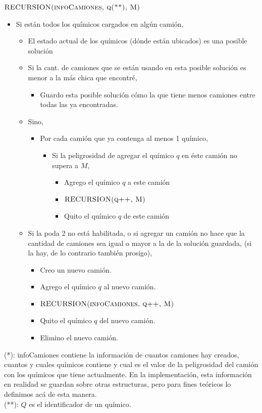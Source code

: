 \noindent
$\textnormal{\scshape RECURSION(infoCamiones, q(**), M)}$
\begin{itemize}
	\item Si est\'an todos los qu\'imicos cargados en alg\'un cami\'on,							
	\begin{itemize}
		\item El estado actual de los qu\'imicos (d\'onde est\'an ubicados) es una posible soluci\'on
		\item Si la cant. de camiones que se est\'an usando en esta posible soluci\'on es menor a la m\'as chica que encontr\'e,
		\begin{itemize}
			\item Guardo esta posible soluci\'on c\'omo la que tiene menos camiones entre todas las ya encontradas.
		\end{itemize}																												
		\item Sino,
		\begin{itemize}
			\item Por cada cami\'on que ya contenga al menos 1 qu\'imico,									
			\begin{itemize}
				\item Si la peligrosidad de agregar el qu\'imico $q$ en \'este cami\'on no supera a $M,$
				\begin{itemize}
					\item Agrego el qu\'imico $q$ a este cami\'on
					\item $\textnormal{\scshape RECURSION(q++, M)}$
					\item Quito el qu\'imico $q$ de este cami\'on
				\end{itemize}
			\end{itemize}		
		\end{itemize}
		\item Si la poda 2 no est\'a habilitada, o si agregar un cami\'on no hace que la cantidad de camiones sea igual o mayor a la de la soluci\'on guardada, (si la hay, de lo contrario tambi\'en prosigo),
		\begin{itemize}
			\item Creo un nuevo cami\'on.
			\item Agrego el qu\'imico $q$ al nuevo cami\'on.
			\item $\textnormal{\scshape RECURSION(infoCamiones, q++, M)}$	
			\item Quito el qu\'imico $q$ del nuevo cami\'on.
			\item Elimino el nuevo cami\'on.
		\end{itemize}
	\end{itemize}			
\end{itemize}
\bigskip
\noindent
(*): infoCamiones contiene la informaci\'on de cuantos camiones hay creados, cuantos y cuales qu\'imicos contiene y cual es el valor de la peligrosidad del cami\'on con los qu\'imicos que tiene actualmente. En la implementaci\'on, esta informaci\'on en realidad se guardan sobre otras estructuras, pero para fines te\'oricos lo definimos ac\'a de esta manera.\\
(**): $Q$ es el identificador de un qu\'imico.
\bigskip
\bigskip

